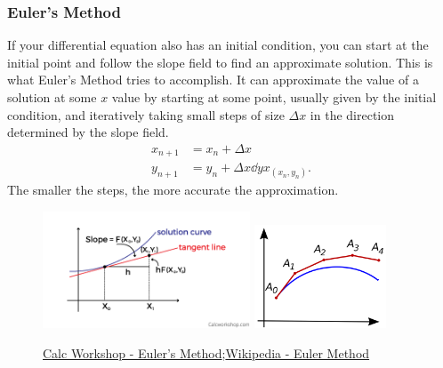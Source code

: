 \subsubsection{Euler's Method}
If your differential equation also has an initial condition, you can start at the initial point and follow the slope field to find an approximate solution.
This is what Euler's Method tries to accomplish.
It can approximate the value of a solution at some $x$ value by starting at some point, usually given by the initial condition, and iteratively taking small steps of size $\Delta x$ in the direction determined by the slope field.
\begin{align*}
	x_{n+1} &= x_n + \Delta x \\
	y_{n+1} &= y_n + \Delta x\dd{y}{x}_{(x_n,y_n)}.
\end{align*}
\noindent
The smaller the steps, the more accurate the approximation.
\begin{figure}[H]
	\label{eulers_method}
	\centering
	\includegraphics[width=0.55\textwidth]{./applications_integrals/Eulers-Approximation.png}
	\includegraphics[width=0.35\textwidth]{./applications_integrals/Eulers-Approximation2.png}
	\caption{\hyperref{https://calcworkshop.com/first-order-differential-equations/eulers-method-table/}{}{}{Calc Workshop - Euler's Method};\hspace{5pt}\hyperref{https://en.wikipedia.org/wiki/Euler\_method}{}{}{Wikipedia - Euler Method}}
\end{figure}

